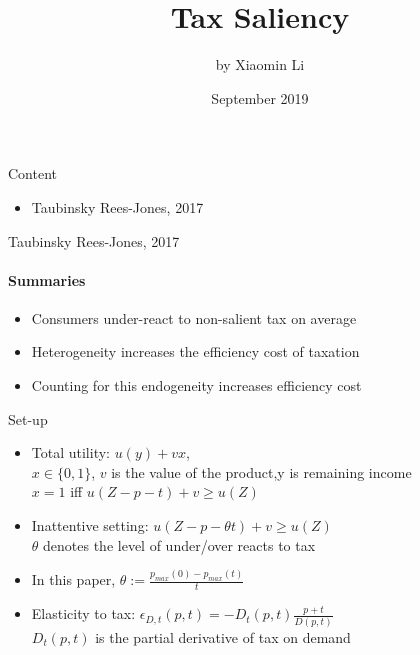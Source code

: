 \documentclass{beamer}
\title{Tax Saliency}
\author{by Xiaomin Li}
\date{September 2019}
\begin{document}
\maketitle
\begin{frame}{Content}
\begin{itemize}
\item Taubinsky Rees-Jones, 2017 
\end{itemize}
\end{frame}
\begin{frame}{Taubinsky Rees-Jones, 2017}
\framesubtitle{Summaries}
\begin{itemize}
    \item Consumers under-react to non-salient tax on average
    \item Heterogeneity increases the efficiency cost of taxation
    \item Counting for this endogeneity increases efficiency cost
\end{itemize}
\end{frame}
\begin{frame}{Set-up}
   \begin{itemize}
       \item Total utility: $u(y)+vx$,
       \\$x \in \{0,1\}$, $v$ is the value of the product,y is remaining income
       \\$x=1$ iff $u(Z-p-t)+v \ge u(Z)$
       \item Inattentive setting: $u(Z-p-\theta t)+v\ge u(Z)$
       \\$\theta$ denotes the level of under/over reacts to tax 
       \item In this paper, $\theta := \frac{p_{max} (0)-p_{max} (t)}{t}$
       \item Elasticity to tax: $\epsilon_{D,t}(p,t)=-D_t(p,t)\frac{p+t}{D(p,t)}$
       \\$D_t(p,t)$ is the partial derivative of tax on demand
\end{itemize}
\end{frame}
\end{document}
